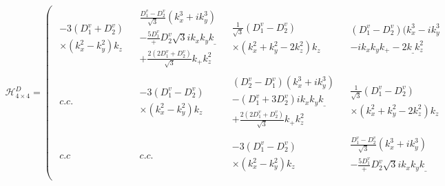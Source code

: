 \begin{align}
\mathcal{H}_{4\times4}^{D} =\left(
 \begin{array}{c|c|c|c}
\begin{array}{c}
-3(D_1^v +D_2^v)\\
\times(k_x^2 -k_y ^2)k_z
\end{array}
&\begin{array}{c}
\frac{D_1^v -D_2^v}{\sqrt{3}}(k_x^3 +ik_y^3)\\
-\frac{5D_1^v} +D_2^v{\sqrt{3}}ik_xk_yk_\_\\
+\frac{2(2D_1^v + D_2^v)}{\sqrt{3}}k_+k_z^2
\end{array}
&\begin{array}{c}
\frac{1}{\sqrt{3}}(D_1^v - D_2^v)\\
\times(k_x^2 +k_y^2 -2k_z^2)k_z
\end{array}
&\begin{array}{c}
(D_1^v -D_2^v)(k_x^3 -ik_y^3\\
-ik_xk_yk_+ -2k_{\_}k_z^2
\end{array}
\\ \hline
\begin{array}{c}
c.c.
\end{array}
&\begin{array}{c}
-3(D_1^v -D_2^v)\\
\times(k_x^2 -k_y ^2)k_z
\end{array}
&\begin{array}{c}
(D_2^v-D_1^v)(k_x^3 +ik_y^3)\\
-(D_1^v +3D_2^v)ik_xk_yk_{\_} \\
+\frac{2(2D_1^v + D_2^v)}{\sqrt{3}}k_+k_z^2
\end{array}
&\begin{array}{c}
\frac{1}{\sqrt{3}}(D_1^v - D_2^v)\\
\times(k_x^2 +k_y^2 -2k_z^2)k_z
\end{array}
\\ \hline
\begin{array}{c}
c.c
\end{array}
&\begin{array}{c}
c.c.
\end{array}
&\begin{array}{c}
 -3(D_1^v -D_2^v)\\
\times(k_x^2 -k_y ^2)k_z
\end{array}
&\begin{array}{c}
\frac{D_1^v -D_2^v}{\sqrt{3}}(k_x^3 +ik_y^3)\\
-\frac{5D_1^v} +D_2^v{\sqrt{3}}ik_xk_yk_\_\\

\end{array}
\end{array}
\end{align}
